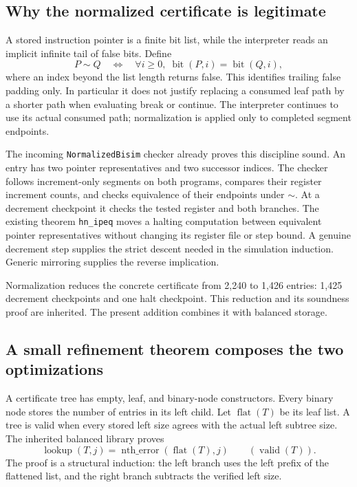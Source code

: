 \documentclass[11pt,letterpaper]{article}
\newcommand{\code}[1]{\texttt{#1}}
\begin{document}
\subsection{Why the normalized certificate is legitimate}
A stored instruction pointer is a finite bit list, while the interpreter reads an implicit infinite tail of false bits. Define
\[
 P\sim Q\quad\Longleftrightarrow\quad
 \forall i\geq0,\;\operatorname{bit}(P,i)=\operatorname{bit}(Q,i),
\]
where an index beyond the list length returns false. This identifies trailing false padding only. In particular it does not justify replacing a consumed leaf path by a shorter path when evaluating break or continue. The interpreter continues to use its actual consumed path; normalization is applied only to completed segment endpoints.

The incoming \code{NormalizedBisim} checker already proves this discipline sound. An entry has two pointer representatives and two successor indices. The checker follows increment-only segments on both programs, compares their register increment counts, and checks equivalence of their endpoints under $\sim$. At a decrement checkpoint it checks the tested register and both branches. The existing theorem \code{hn\_ipeq} moves a halting computation between equivalent pointer representatives without changing its register file or step bound. A genuine decrement step supplies the strict descent needed in the simulation induction. Generic mirroring supplies the reverse implication.

Normalization reduces the concrete certificate from 2,240 to 1,426 entries: 1,425 decrement checkpoints and one halt checkpoint. This reduction and its soundness proof are inherited. The present addition combines it with balanced storage.

\subsection{A small refinement theorem composes the two optimizations}
A certificate tree has empty, leaf, and binary-node constructors. Every binary node stores the number of entries in its left child. Let $\operatorname{flat}(T)$ be its leaf list. A tree is valid when every stored left size agrees with the actual left subtree size. The inherited balanced library proves
\[
 \operatorname{lookup}(T,j)=
 \operatorname{nth\_error}(\operatorname{flat}(T),j)
 \qquad(\operatorname{valid}(T)).
\]
The proof is a structural induction: the left branch uses the left prefix of the flattened list, and the right branch subtracts the verified left size.
\end{document}
